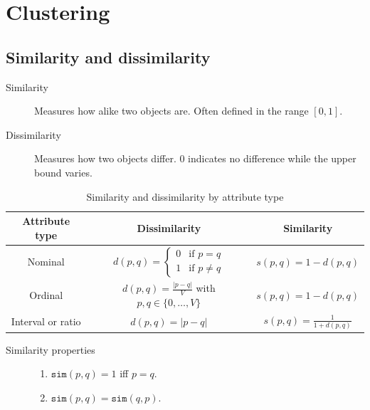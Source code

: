 \chapter{Clustering}


\section{Similarity and dissimilarity}

\begin{description}
    \item[Similarity] 
        Measures how alike two objects are.
        Often defined in the range $[0, 1]$.

    \item[Dissimilarity] 
        Measures how two objects differ.
        0 indicates no difference while the upper bound varies.
\end{description}

\begin{table}[H]
    \centering
    \renewcommand{\arraystretch}{2}
    \begin{tabular}{c | c | c}
        \textbf{Attribute type} & \textbf{Dissimilarity} & \textbf{Similarity} \\
        \hline
        Nominal & $d(p, q) = \begin{cases} 0 & \text{if } p=q \\ 1 & \text{if } p \neq q \end{cases}$ & $s(p, q) = 1 - d(p, q)$ \\
        \hline
        Ordinal & $d(p, q) = \frac{\vert p - q \vert}{V}$ with $p, q \in \{ 0, \dots, V \}$ & $s(p, q) = 1 - d(p, q)$ \\
        \hline
        Interval or ratio & $d(p, q) = \vert p - q \vert$ & $s(p, q) = \frac{1}{1 + d(p, q)}$
    \end{tabular}
    \caption{Similarity and dissimilarity by attribute type}
\end{table}

\begin{description}
    \item[Similarity properties] \phantom{}
        \begin{enumerate}
            \item $\texttt{sim}(p, q) = 1$ iff $p = q$. 
            \item $\texttt{sim}(p, q) = \texttt{sim}(q, p)$. 
        \end{enumerate}
\end{description}


